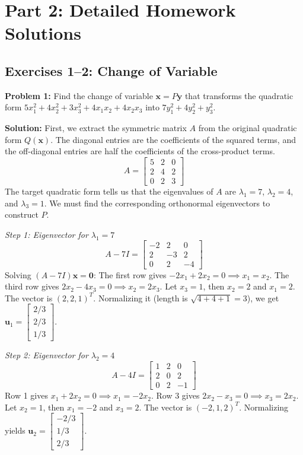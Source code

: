\documentclass[11pt, letterpaper]{article}
\theoremstyle{definition}
\theoremstyle{remark}
\begin{document}
\newpage

\section{Part 2: Detailed Homework Solutions}

\subsection{Exercises 1--2: Change of Variable}

\textbf{Problem 1:} Find the change of variable $\mathbf{x} = P\mathbf{y}$ that transforms the quadratic form $5x_1^2 + 4x_2^2 + 3x_3^2 + 4x_1x_2 + 4x_2x_3$ into $7y_1^2 + 4y_2^2 + y_3^2$.

\textbf{Solution:}
First, we extract the symmetric matrix $A$ from the original quadratic form $Q(\mathbf{x})$. The diagonal entries are the coefficients of the squared terms, and the off-diagonal entries are half the coefficients of the cross-product terms.
\[ A = \begin{bmatrix} 5 & 2 & 0 \\ 2 & 4 & 2 \\ 0 & 2 & 3 \end{bmatrix} \]
The target quadratic form tells us that the eigenvalues of $A$ are $\lambda_1 = 7$, $\lambda_2 = 4$, and $\lambda_3 = 1$. We must find the corresponding orthonormal eigenvectors to construct $P$.

\textit{Step 1: Eigenvector for $\lambda_1 = 7$}
\[ A - 7I = \begin{bmatrix} -2 & 2 & 0 \\ 2 & -3 & 2 \\ 0 & 2 & -4 \end{bmatrix} \]
Solving $(A - 7I)\mathbf{x} = \mathbf{0}$: The first row gives $-2x_1 + 2x_2 = 0 \implies x_1 = x_2$. The third row gives $2x_2 - 4x_3 = 0 \implies x_2 = 2x_3$. Let $x_3 = 1$, then $x_2 = 2$ and $x_1 = 2$. The vector is $(2, 2, 1)^T$. Normalizing it (length is $\sqrt{4+4+1} = 3$), we get $\mathbf{u}_1 = \begin{bmatrix} 2/3 \\ 2/3 \\ 1/3 \end{bmatrix}$.

\textit{Step 2: Eigenvector for $\lambda_2 = 4$}
\[ A - 4I = \begin{bmatrix} 1 & 2 & 0 \\ 2 & 0 & 2 \\ 0 & 2 & -1 \end{bmatrix} \]
Row 1 gives $x_1 + 2x_2 = 0 \implies x_1 = -2x_2$. Row 3 gives $2x_2 - x_3 = 0 \implies x_3 = 2x_2$. Let $x_2 = 1$, then $x_1 = -2$ and $x_3 = 2$. The vector is $(-2, 1, 2)^T$. Normalizing yields $\mathbf{u}_2 = \begin{bmatrix} -2/3 \\ 1/3 \\ 2/3 \end{bmatrix}$.
\end{document}
